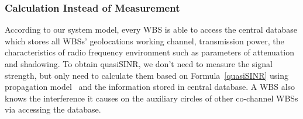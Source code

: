 


\subsubsection*{Calculation Instead of Measurement}
According to our system model, every WBS is able to access the central database which stores all WBSs' geolocations \ie working channel, transmission power, the characteristics of radio frequency environment such as parameters of attenuation and shadowing.
To obtain quasiSINR, we don't need to measure the signal strength, but only need to calculate them based on Formula~\ref{quasiSINR} using propagation model~\cite{Jaentti11} and the information stored in central database.
A WBS also knows the interference it causes on the auxiliary circles of other co-channel WBSs via accessing the database.



